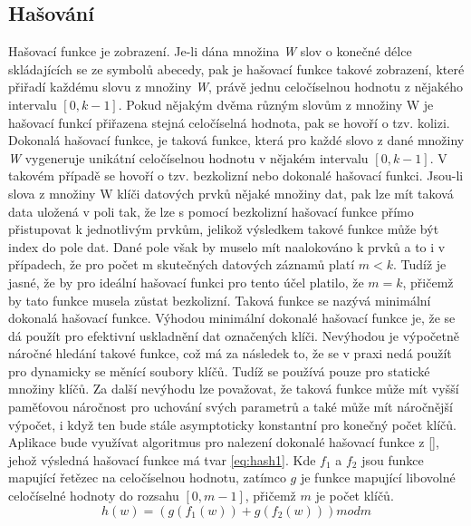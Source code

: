 \documentclass[11pt,twoside,a4paper]{book}
\begin{document}
\subsection {\label{SEC:hashP} Hašování}
Hašovací funkce je zobrazení. Je-li dána množina \textit{W} slov o konečné délce skládajících se ze symbolů abecedy, pak je hašovací funkce takové zobrazení, které přiřadí každému slovu z množiny \textit{W}, právě jednu celočíselnou hodnotu z nějakého intervalu $[0,k-1]$. Pokud nějakým dvěma různým slovům z množiny W je hašovací funkcí přiřazena stejná celočíselná hodnota, pak se hovoří o tzv. kolizi.
Dokonalá hašovací funkce, je taková funkce, která pro každé slovo z dané množiny \textit{W} vygeneruje unikátní celočíselnou hodnotu v nějakém intervalu $[0,k-1]$. V takovém případě se hovoří o tzv. bezkolizní nebo dokonalé hašovací funkci. Jsou-li slova z množiny W klíči datových prvků nějaké množiny dat, pak lze mít taková data uložená v poli tak, že lze s pomocí bezkolizní hašovací funkce přímo přistupovat k jednotlivým prvkům, jelikož výsledkem takové funkce může být index do pole dat. Dané pole však by muselo mít naalokováno k prvků a to i v případech, že pro počet m skutečných datových záznamů platí $m<k$. Tudíž je jasné, že by pro ideální hašovací funkci pro tento účel platilo, že $m=k$, přičemž by tato funkce musela zůstat bezkolizní. Taková funkce se nazývá minimální dokonalá hašovací funkce.
Výhodou minimální dokonalé hašovací funkce je, že se dá použít pro efektivní uskladnění dat označených klíči. Nevýhodou je výpočetně náročné hledání takové funkce, což má za následek to, že se v praxi nedá použít pro dynamicky se měnící soubory klíčů. Tudíž se používá pouze pro statické množiny klíčů. Za další nevýhodu lze považovat, že taková funkce může mít vyšší paměťovou náročnost pro uchování svých parametrů a také může mít náročnější výpočet, i když ten bude stále asymptoticky konstantní pro konečný počet klíčů.
Aplikace bude využívat algoritmus pro nalezení dokonalé hašovací funkce z [\cite{bib:hashPerfect}], jehož výsledná hašovací funkce má tvar \ref{eq:hash1}.
Kde $f_1$ a $f_2$ jsou funkce mapující řetězec na celočíselnou hodnotu, zatímco $g$ je funkce mapující libovolné celočíselné hodnoty do rozsahu $[0,m-1]$, přičemž $m$ je počet klíčů. 
\begin{equation} \label{eq:hash1}
h(w) = (g(f_1(w))+g(f_2(w))) mod m
\end{equation}
\end{document}
